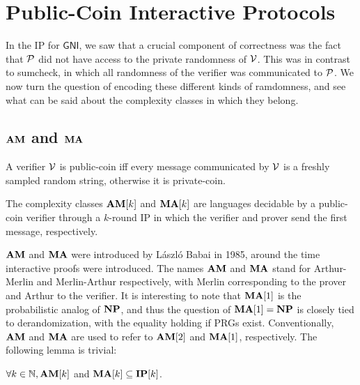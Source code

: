 \section{Public-Coin Interactive Protocols}

In the IP for $\mathsf{GNI}$, we saw that a crucial component of correctness was the fact that $\mathcal{P}$ did not have access to the private randomness of $\mathcal{V}$. This was in contrast to sumcheck, in which all randomness of the verifier was communicated to $\mathcal{P}$. We now turn the question of encoding these different kinds of ramdomness, and see what can be said about the complexity classes in which they belong.

\subsection{$\am$ and $\ma$}

\begin{definition}
	A verifier $\mathcal{V}$ is public-coin iff every message communicated by $\mathcal{V}$ is a freshly sampled random string, otherwise it is private-coin.
\end{definition}

\begin{definition}[$\am$ and $\ma$]
	The complexity classes $\mathbf{AM}[k]$ and $\mathbf{MA}[k]$ are languages decidable by a public-coin verifier through a $k$-round IP in which the verifier and prover send the first message, respectively.
\end{definition}

$\am$ and $\ma$ were introduced by László Babai \cite{10.1145/22145.22192} in 1985, around the time interactive proofs were introduced. The names $\am$ and $\ma$ stand for Arthur-Merlin and Merlin-Arthur respectively, with Merlin corresponding to the prover and Arthur to the verifier. It is interesting to note that $\mathbf{MA}[1]$ is the probabilistic analog of $\mathbf{NP}$, and thus the question of $\mathbf{MA}[1]=\mathbf{NP}$ is closely tied to derandomization, with the equality holding if PRGs exist. Conventionally, $\am$ and $\ma$ are used to refer to $\mathbf{AM}[2]$ and $\mathbf{MA}[1]$, respectively. The following lemma is trivial:

\begin{lemma}
	\label{lem:ammainip}
	$\forall k\in\mathbb{N}, \mathbf{AM}[k]$ and $\mathbf{MA}[k]\subseteq\mathbf{IP}[k]$.
\end{lemma}

\vspace{4mm}

